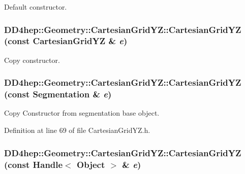 Default constructor. \hypertarget{class_d_d4hep_1_1_geometry_1_1_cartesian_grid_y_z_a137cf0fec563952ae183d5ce5675dbe2}{
\subsubsection[{CartesianGridYZ}]{\setlength{\rightskip}{0pt plus 5cm}DD4hep::Geometry::CartesianGridYZ::CartesianGridYZ (const {\bf CartesianGridYZ} \& {\em e})}}
\label{class_d_d4hep_1_1_geometry_1_1_cartesian_grid_y_z_a137cf0fec563952ae183d5ce5675dbe2}


Copy constructor. \hypertarget{class_d_d4hep_1_1_geometry_1_1_cartesian_grid_y_z_ae3f9ea2435ad2c614ef57d1acd4bef8d}{
\subsubsection[{CartesianGridYZ}]{\setlength{\rightskip}{0pt plus 5cm}DD4hep::Geometry::CartesianGridYZ::CartesianGridYZ (const {\bf Segmentation} \& {\em e})}}
\label{class_d_d4hep_1_1_geometry_1_1_cartesian_grid_y_z_ae3f9ea2435ad2c614ef57d1acd4bef8d}


Copy Constructor from segmentation base object. 

Definition at line 69 of file CartesianGridYZ.h.\hypertarget{class_d_d4hep_1_1_geometry_1_1_cartesian_grid_y_z_ab68e61e001c4eea7d4e6aa57dc7f99e4}{
\subsubsection[{CartesianGridYZ}]{\setlength{\rightskip}{0pt plus 5cm}DD4hep::Geometry::CartesianGridYZ::CartesianGridYZ (const {\bf Handle}$<$ {\bf Object} $>$ \& {\em e})}}
\label{class_d_d4hep_1_1_geometry_1_1_cartesian_grid_y_z_ab68e61e001c4eea7d4e6aa57dc7f99e4}


